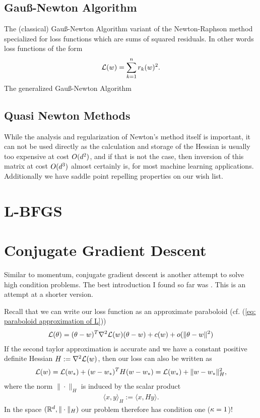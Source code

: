 \subsection{Gauß-Newton Algorithm}

The (classical) Gauß-Newton Algorithm variant of the Newton-Raphson method
specialized for loss functions which are sums of squared residuals. In other
words loss functions of the form
\begin{align*}
	\mathcal{L}(w) = \sum_{k=1}^n r_k(w)^2.
\end{align*}
The generalized Gauß-Newton Algorithm 
\textcite{bottouOptimizationMethodsLargeScale2018}

\subsection{Quasi Newton Methods}

While the analysis and regularization of Newton's method itself is important,
it can not be used directly as the calculation and storage of the Hessian is
usually too expensive at cost \(O(d^2)\), and if that is not the case,
then inversion of this matrix at cost \(O(d^3)\) almost certainly is,
for most machine learning applications. Additionally we have saddle point
repelling properties on our wish list.

\section{L-BFGS}


\section{Conjugate Gradient Descent}

Similar to momentum, conjugate gradient descent is another attempt to solve
high condition problems. The best introduction I found so far was
\textcite{shewchukIntroductionConjugateGradient1994}. This is an attempt at a
shorter version. 

Recall that we can write
our loss function as an approximate paraboloid (cf. (\ref{eq: paraboloid
approximation of L}))
\begin{align*}
	\mathcal{L}(\theta)
	= (\theta-w)^T \nabla^2\mathcal{L}(w)(\theta-w)
	+ c(w) + o(\|\theta-w\|^2)
\end{align*}
If the second taylor approximation is accurate and we have a constant
positive definite Hessian \(H:=\nabla^2\mathcal{L}(w)\), then our loss can also
be written as
\begin{align*}
	\mathcal{L}(w) = \mathcal{L}(w_*) + 
	(w-w_*)^T H(w-w_*)
	= \mathcal{L}(w_*) + \|w-w_*\|_H^2,
\end{align*}
where the norm \(\|\cdot\|_H\) is induced by the scalar product
\begin{align*}
	\langle x, y \rangle_H := \langle x, Hy\rangle.
\end{align*}
In the space \((\mathbb{R}^d, \|\cdot\|_H)\) our problem therefore has condition one
(\(\kappa=1\))!

